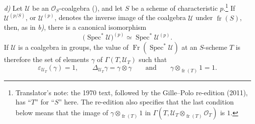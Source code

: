 \smallskip
\noindent\textit{d)}
Let \(\mathcal U\) be an \(\mathcal O_S\)-coalgebra (), and let
\(S\) be a scheme of characteristic \(p\).\footnote{Translator's note:
the 1970 text, followed by the Gille--Polo re-edition (2011), has
``\(T\)'' for ``\(S\)'' here. The re-edition also specifies that the last
condition below means that the image of
\(\gamma\otimes_{\operatorname{fr}(T)}1\) in
\(\Gamma(T,\mathcal U_T\otimes_{\operatorname{fr}(T)}\mathcal O_T)\)
is \(1\).} If
\(\mathcal U^{(p/S)}\), or \(\mathcal U^{(p)}\), denotes the inverse
image of the coalgebra \(\mathcal U\) under \(\operatorname{fr}(S)\),
then, as in \textit{b)}, there is a canonical isomorphism
\[
  \bigl(\operatorname{Spec}^{*}\mathcal U\bigr)^{(p)}
  \simeq
  \operatorname{Spec}^{*}\mathcal U^{(p)}.
\]
If \(\mathcal U\) is a coalgebra in groups, the value of
\(\operatorname{Fr}(\operatorname{Spec}^{*}\mathcal U)\) at an
\(S\)-scheme \(T\) is therefore the set of elements \(\gamma\) of
\(\Gamma(T,\mathcal U_T)\) such that
\[
  \varepsilon_{\mathcal U_T}(\gamma)=1,
  \qquad
  \Delta_{\mathcal U_T}\gamma=\gamma\otimes\gamma
  \qquad\text{and}\qquad
  \gamma\otimes_{\operatorname{fr}(T)}1=1.
\]

